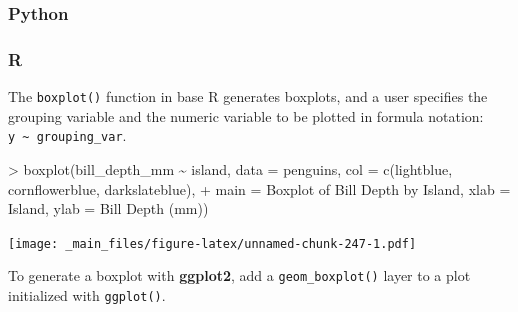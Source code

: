 \documentclass[
]{book}
\newenvironment{Shaded}{\begin{snugshade}}{\end{snugshade}}
\newcommand{\AttributeTok}[1]{\textcolor[rgb]{0.77,0.63,0.00}{#1}}
\newcommand{\FunctionTok}[1]{\textcolor[rgb]{0.00,0.00,0.00}{#1}}
\newcommand{\NormalTok}[1]{#1}
\newcommand{\SpecialCharTok}[1]{\textcolor[rgb]{0.00,0.00,0.00}{#1}}
\newcommand{\StringTok}[1]{\textcolor[rgb]{0.31,0.60,0.02}{#1}}
\begin{document}
\hypertarget{python-43}{%
\subsubsection*{Python}\label{python-43}}

\hypertarget{r-43}{%
\subsubsection*{R}\label{r-43}}

The \texttt{boxplot()} function in base R generates boxplots, and a user specifies the grouping variable and the numeric variable to be plotted in formula notation: \texttt{y\ \textasciitilde{}\ grouping\_var}.

\begin{Shaded}
\begin{Highlighting}[]
\SpecialCharTok{\textgreater{}} \FunctionTok{boxplot}\NormalTok{(bill\_depth\_mm }\SpecialCharTok{\textasciitilde{}}\NormalTok{ island, }\AttributeTok{data =}\NormalTok{ penguins, }\AttributeTok{col =} \FunctionTok{c}\NormalTok{(}\StringTok{\textquotesingle{}lightblue\textquotesingle{}}\NormalTok{, }\StringTok{\textquotesingle{}cornflowerblue\textquotesingle{}}\NormalTok{, }\StringTok{\textquotesingle{}darkslateblue\textquotesingle{}}\NormalTok{),}
\SpecialCharTok{+}         \AttributeTok{main =} \StringTok{\textquotesingle{}Boxplot of Bill Depth by Island\textquotesingle{}}\NormalTok{, }\AttributeTok{xlab =} \StringTok{\textquotesingle{}Island\textquotesingle{}}\NormalTok{, }\AttributeTok{ylab =} \StringTok{\textquotesingle{}Bill Depth (mm)\textquotesingle{}}\NormalTok{)}
\end{Highlighting}
\end{Shaded}

\texttt{[image: \_main\_files/figure-latex/unnamed-chunk-247-1.pdf]}

To generate a boxplot with \textbf{ggplot2}, add a \texttt{geom\_boxplot()} layer to a plot initialized with \texttt{ggplot()}.
\end{document}
